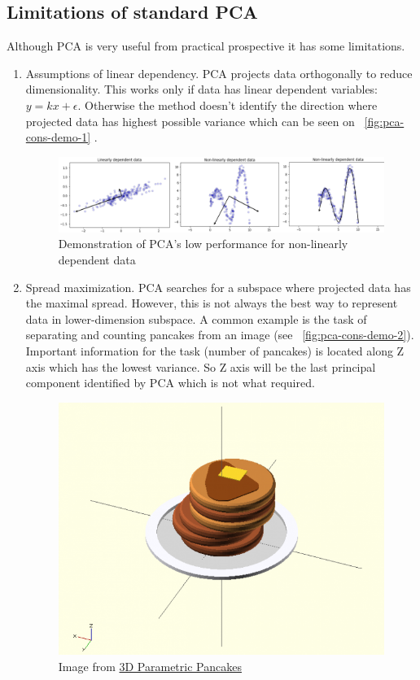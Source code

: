 \subsection{Limitations of standard PCA}
Although PCA is very useful from practical prospective it has some limitations.
\begin{enumerate}
	\item Assumptions of linear dependency.
	PCA projects data orthogonally to reduce dimensionality. This works only if data has linear dependent variables:  $y = k x + \epsilon$. Otherwise the method doesn't identify the direction where  projected data has highest possible variance which can be seen on   ~\autoref{fig:pca-cons-demo-1} . 
	
	\begin{figure}
		\includegraphics[scale=0.4]{img/pca-linear-separation-demo.png}
		\caption{\label{fig:pca-cons-demo-1}Demonstration of PCA's low performance for non-linearly dependent data}
	\end{figure}
	
	\item Spread maximization. 
	PCA searches for a subspace where projected data has the maximal spread. However, this is not always the best way to represent data in lower-dimension subspace. A common example is the task of separating and counting pancakes from an image (see ~\autoref{fig:pca-cons-demo-2}). Important information for the task (number of pancakes) is located along Z axis which has the lowest variance. So Z axis will be the last principal component identified by PCA which is not what required. 
	
	\begin{figure}
		\centering
		\includegraphics[width=.5\textwidth, scale=0.4]{img/pancakes.png}
		\caption{\label{fig:pca-cons-demo-2}Image from  \href{http://golancourses.net/2014/kevan/01/23/3d-parametric-pancakes/}{3D Parametric Pancakes}
		}
	\end{figure}
	

\end{enumerate}
